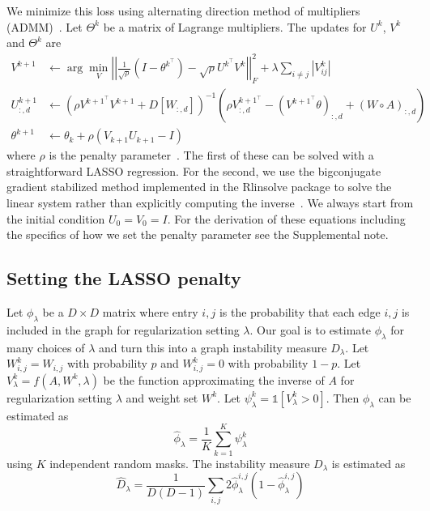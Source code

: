 \documentclass{article}
\begin{document}
We minimize this loss using alternating direction method of multipliers (ADMM)~\cite{Boyd2010}.
Let $\Theta^k$ be a matrix of Lagrange multipliers. The updates for $U^k$, $V^k$ and $\Theta^k$
are
\begin{align}
V^{k+1} &\leftarrow \arg \min_{V} \left|\left|\frac{1}{\sqrt{\rho}}\left(I-\theta^{k^\top}\right) -
      \sqrt{\rho} U^{k^\top} V^k\right|\right|_F^2 + \lambda \sum_{i\neq j} \left|V^k_{ij} \right| \\
U_{:, d}^{k+1} &\leftarrow \left(\rho V^{k+1 ^ \top} V^{k+1} + D[W_{:, d}]\right)^{-1} \left(\rho V^{k+1 ^ \top}_{:, d} -
  \left(V^{k+1 ^ \top} \theta\right)_{:, d} + (W \circ A)_{:, d}\right) \\
\theta^{k+1} &\leftarrow \theta_{k} + \rho(V_{k+1}U_{k+1}-I)
\end{align}
where $\rho$ is the penalty parameter~\cite{Boyd2010}.
The first of these can be solved with a straightforward LASSO regression. For the second,
we use the bigconjugate gradient stabilized method implemented
in the Rlinsolve package to solve the linear system
rather than explicitly computing the inverse~\cite{You2018}.
We always start from the initial condition $U_0 = V_0 = I$.
 For the derivation of these equations including
the specifics of how we set
the penalty parameter see the Supplemental note.

\subsection{Setting the LASSO penalty}
Let $\phi_{\lambda}$ be a $D\times D$ matrix where entry $i, j$ is the probability that each edge
$i,j$ is included in the graph for regularization setting $\lambda$. Our goal is to
estimate $\phi_{\lambda}$ for many choices of $\lambda$ and
turn this into a graph instability measure $D_\lambda$.
Let $W^k_{i,j} = W_{i,j}$ with probability $p$ and $W^k_{i,j} = 0$ with
probability $1-p$. Let $V_{\lambda}^k = f(A, W^k, \lambda)$ be
 the function approximating the inverse of
$A$ for regularization setting
$\lambda$ and weight set $W^k$. Let $\psi^k_{\lambda} = \mathds{1}[V^k_{\lambda} > 0]$.
Then  $\phi_{\lambda}$ can be estimated as
\begin{equation}
\hat{\phi}_{\lambda} = \frac{1}{K} \sum_{k=1}^K \psi^{k}_{\lambda}
\end{equation}
using $K$ independent random masks.
The instability measure $D_\lambda$ is estimated as~\cite{Liu2010}
\begin{equation}
\hat{D}_\lambda = \frac{1}{D(D-1)} \sum_{i, j} 2 \hat{\phi}^{i, j}_\lambda(1-\hat{\phi}^{i, j}_\lambda)
\end{equation}
\end{document}

